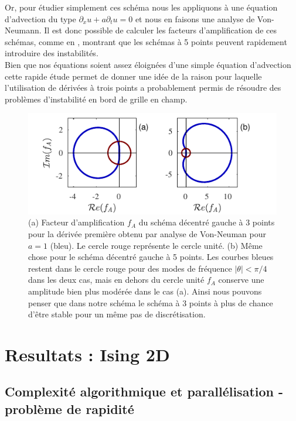\documentclass[10pt]{article}
\begin{document}
\begin{multicols}{2}
Or, pour étudier simplement ces schéma nous les appliquons à une équation d'advection du type $\partial_x u + a \partial_t u = 0$ et nous en faisons une analyse de Von-Neumann. Il est donc possible de calculer les facteurs d'amplification de ces schémas, comme en , montrant que les schémas à 5 points peuvent rapidement introduire des instabilités.\\

Bien que nos équations soient assez éloignées d'une simple équation d'advection cette rapide étude permet de donner une idée de la raison pour laquelle l'utilisation de dérivées à trois points a probablement permis de résoudre des problèmes d'instabilité en bord de grille en champ.

\begin{figure}[H]
\begin{center}
	\includegraphics[width=0.95\columnwidth]{FacAmp.pdf}
\end{center}
\caption{(a) Facteur d'amplification $f_A$ du schéma décentré gauche à 3 points pour la dérivée première obtenu par analyse de Von-Neuman pour $a=1$ (bleu). Le cercle rouge représente le cercle unité. (b) Même chose pour le schéma décentré gauche à 5 points. Les courbes bleues restent dans le cercle rouge pour des modes de fréquence $|\theta| < \pi/4$ dans les deux cas, mais en dehors du cercle unité $f_A$ conserve une amplitude bien plus modérée dans le cas (a). Ainsi nous pouvons penser que dans notre schéma le schéma à 3 points à plus de chance d'être stable pour un même pas de discrétisation.}
\label{fig:FacAmp}
\end{figure}


\section{Resultats : Ising 2D}

\subsection{Complexité algorithmique et parallélisation - problème de rapidité} 


\end{multicols}
\end{document}
